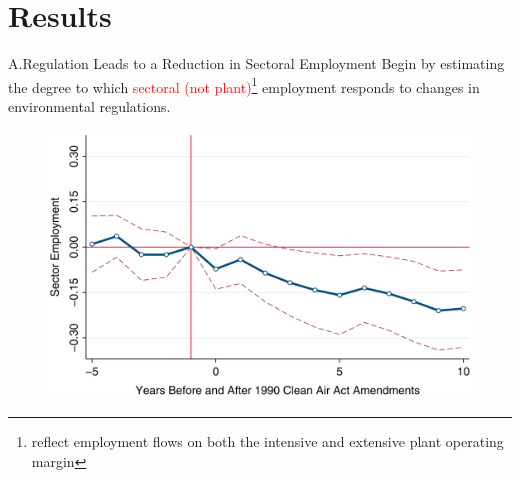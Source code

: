 \documentclass{beamer}
\begin{document}
\section{Results}
\begin{frame}[shrink]
	\transfade %
	\tableofcontents[sectionstyle=show/shaded,subsectionstyle=show/shaded/hide]
	\addtocounter{framenumber}{-1}
\end{frame}
\begin{frame}[label=figure2]{A.Regulation Leads to a Reduction in Sectoral Employment}
	Begin by estimating the degree to which \textcolor{red}{sectoral (not plant)}\footnote{reflect employment flows on both the intensive and extensive plant operating margin} employment responds to changes in environmental regulations.
	\begin{figure}[h]
		\centering
		\includegraphics[scale=0.33]{figure2.png}
	\end{figure}
\end{frame}
\end{document}
